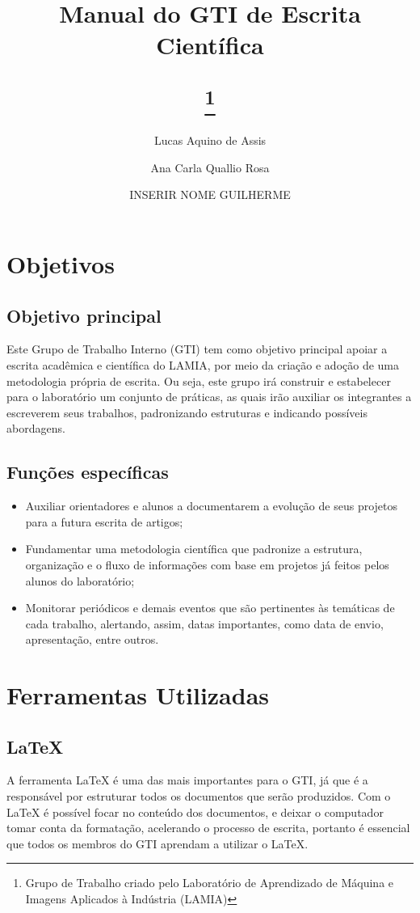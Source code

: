 \documentclass{article}
\title{Manual do GTI de Escrita Científica
	\author{
		Lucas Aquino de Assis
		\and
		Ana Carla Quallio Rosa
		\and
		INSERIR NOME GUILHERME
	}
	\thanks{Grupo de Trabalho criado pelo Laboratório de Aprendizado de Máquina e Imagens Aplicados à Indústria (LAMIA)}
}
\begin{document}
\begin{titlepage}
\maketitle
\end{titlepage}

\tableofcontents

\section{Objetivos}
\subsection{Objetivo principal}
Este Grupo de Trabalho Interno (GTI) tem como objetivo principal apoiar a escrita acadêmica e científica do LAMIA, por meio da criação e adoção de uma metodologia própria de escrita. Ou seja, este grupo irá construir e estabelecer para o laboratório um conjunto de práticas, as quais irão auxiliar os integrantes a escreverem seus trabalhos, padronizando estruturas e indicando possíveis abordagens. 

\subsection{Funções específicas}
\begin{itemize}
  \item Auxiliar orientadores e alunos a documentarem a evolução de seus projetos para a futura escrita de artigos;
  \item Fundamentar uma metodologia científica que padronize a estrutura, organização e o fluxo de informações com base em projetos já feitos pelos alunos do laboratório;
  \item Monitorar periódicos e demais eventos que são pertinentes às temáticas de cada trabalho, alertando, assim, datas importantes, como data de envio, apresentação, entre outros.
\end{itemize}

\section{Ferramentas Utilizadas}
\subsection{LaTeX}
A ferramenta LaTeX é uma das mais importantes para o GTI, já que é a responsável por estruturar todos os documentos que serão produzidos. Com o LaTeX é possível focar no conteúdo dos documentos, e deixar o computador tomar conta da formatação, acelerando o processo de escrita, portanto é essencial que todos os membros do GTI aprendam a utilizar o LaTeX.
\end{document}
